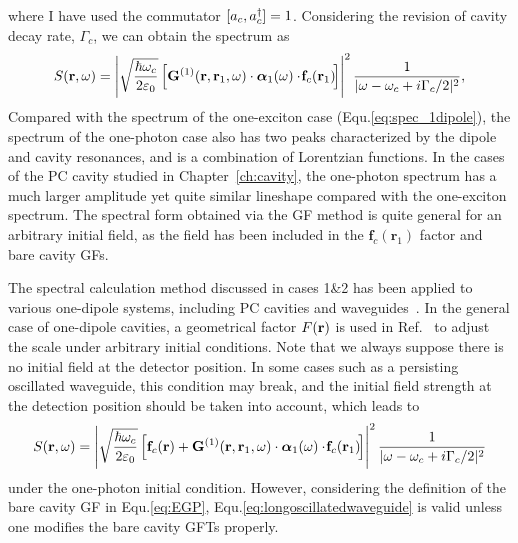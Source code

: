 where I have used the commutator $[a_c, a^{\dagger}_c]=1$.
Considering the revision of cavity decay rate, $\Gamma_c$, we can obtain the spectrum as
\begin{equation}
S({\bf r},\omega)=\left |\sqrt{\frac{\hbar
\omega_c}{2\varepsilon_0}}\left [
\mathbf{G}^{(1)}(\mathbf{r},\mathbf{r}_1,\omega)\cdot {\bm \alpha}_1(\omega) \cdot \!
\mathbf{f}_c(\mathbf{r}_1) \!\right
]\right
|^2\frac{1}{|\omega-\omega_c+i\Gamma_c/2|^2},\label{eq:s_init_f}
\end{equation}
Compared with the spectrum of the one-exciton case (Equ.\eqref{eq:spec_1dipole}), the spectrum of the one-photon case also has two peaks characterized by the dipole and cavity resonances, and is a combination of Lorentzian functions.
In the cases of the PC cavity studied in Chapter~\ref{ch:cavity}, the one-photon spectrum has a much larger amplitude yet quite similar lineshape compared with the one-exciton spectrum. The spectral form obtained via the GF method is quite general for an arbitrary initial field, as the field has been included in the $\mathbf{f}_c(\mathbf{r}_1)$ factor and bare cavity GFs.

The spectral calculation method discussed in cases 1\&2 has been applied to various one-dipole systems, including PC cavities and waveguides~\cite{Yao2009a,Yao2009b,Yao2009}. In the general case of one-dipole cavities, a geometrical factor $F(\mathbf{r})$ is used in Ref.~\cite{Yao2009c} to adjust the scale under arbitrary initial conditions. Note that we always suppose there is no initial field at the detector position. In some cases such as a persisting oscillated waveguide, this condition may break, and the initial field strength at the detection position should be taken into account, which leads to
\begin{equation}\label{eq:longoscillatedwaveguide}
S({\bf r},\omega)= \left |\sqrt{\frac{\hbar
\omega_c}{2\varepsilon_0}}\left [\mathbf{f}_c(\mathbf{r})+
\mathbf{G}^{(1)}(\mathbf{r},\mathbf{r}_1,\omega)\cdot {\bm \alpha}_1(\omega) \cdot \!
\mathbf{f}_c(\mathbf{r}_1) \!\right
]\right|^2\frac{1}{|\omega-\omega_c+i\Gamma_c/2|^2}
\end{equation}
under the one-photon initial condition. However, considering the definition of the bare cavity GF in Equ.\eqref{eq:EGP}, Equ.\eqref{eq:longoscillatedwaveguide} is valid unless one modifies the bare cavity GFTs properly.


